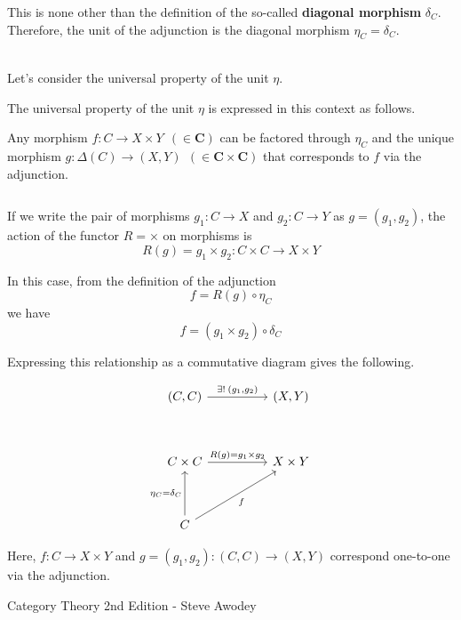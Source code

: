\documentclass[uplatex,a4j,12pt,dvipdfmx]{jsarticle}
\begin{document}
This is none other than the definition of the so-called \textbf{diagonal morphism} $\delta_{C}$.
Therefore, the unit of the adjunction is the diagonal morphism $\eta_{C} = \delta_{C}$.

\ \\

Let's consider the universal property of the unit $\eta$.

The universal property of the unit $\eta$ is expressed in this context as follows.

Any morphism
$f: C \to X \times Y \ \ (\in \mathbf{C})$
can be factored through $\eta_{C}$ and
the unique morphism
$g: \Delta(C) \to (X,Y) \ \ (\in \mathbf{C} \times \mathbf{C})$
that corresponds to $f$ via the adjunction.

${}$

If we write the pair of morphisms $g_{1}: C \to X$ and $g_{2}: C \to Y$ as
$g=(g_{1},g_{2})$,
the action of the functor $R=\times$ on morphisms is
$$
	R(g) = g_{1} \times g_{2} : C \times C \to X \times Y
$$

In this case, from the definition of the adjunction
$$
	f =R(g) \circ \eta_{C}
$$
we have
$$
	f = (g_{1} \times g_{2}) \circ \delta_{C}
$$

Expressing this relationship as a commutative diagram gives the following.

\[
	\begin{tikzcd}
		{(C,C)} \arrow[rr, "{\exists ! \ \! (g_{1},g_{2})}"] && {(X,Y)}\\
		&&\\
		C \times C \arrow[rr, "R(g)=g_{1} \times g_{2}"]&& X \times Y \\
		&&\\
		C \arrow[rruu, "f"'] \arrow[uu, "\eta_{C}=\delta_{C}"]&&
	\end{tikzcd}
\]

Here, $f : C \to X \times Y$
and $g=(g_{1},g_{2}): (C,C) \to (X,Y)$
correspond one-to-one via the adjunction.

\begin{thebibliography}{9}
	Category Theory 2nd Edition - Steve Awodey
\end{thebibliography}
\end{document}
